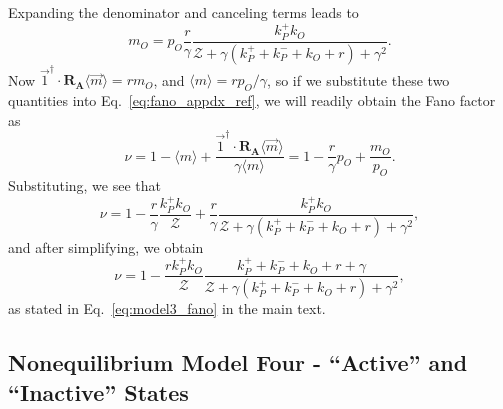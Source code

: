 Expanding the denominator and canceling terms leads to
\begin{equation}
m_O = p_O \frac{r}{\gamma} \frac{k_P^+ k_O}
    {\mathcal{Z} + \gamma(k_P^+ + k_P^- + k_O + r) + \gamma^2}.
\end{equation}
Now $\vec{1}^\dagger\cdot\mathbf{R_A}\langle\vec{m}\rangle = r m_O$, and
$\langle{m}\rangle = rp_O/\gamma$, so if we substitute these two quantities into
Eq.~\ref{eq:fano_appdx_ref}, we will readily obtain the Fano factor as
\begin{equation}
\nu = 1 - \langle{m}\rangle
    + \frac{\vec{1}^\dagger\cdot\mathbf{R_A}\langle\vec{m}\rangle}
            {\gamma \langle{m}\rangle}
= 1 - \frac{r}{\gamma}p_O + \frac{m_O}{p_O}.
\end{equation}
Substituting, we see that
\begin{equation}
\nu = 1 - \frac{r}{\gamma} \frac{k_P^+ k_O}{\mathcal{Z}}
    + \frac{r}{\gamma}
    \frac{k_P^+ k_O}
            {\mathcal{Z} + \gamma(k_P^+ + k_P^- + k_O + r) + \gamma^2},
\end{equation}
and after simplifying, we obtain
\begin{equation}
\nu = 1 - \frac{r k_P^+ k_O}{\mathcal{Z}}
        \frac{k_P^+ + k_P^- + k_O + r + \gamma}
            {\mathcal{Z} + \gamma(k_P^+ + k_P^- + k_O + r) + \gamma^2},
\end{equation}
as stated in Eq.~\ref{eq:model3_fano} in the main text.
        
\subsection{Nonequilibrium Model Four - ``Active'' and ``Inactive'' States}
